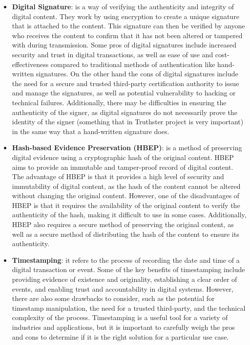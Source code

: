 \documentclass[target=mst,aauheader=]{thud}
\begin{document}
\begin{itemize}

    \item \textbf{Digital Signature}: is a way of verifying the authenticity and integrity of digital content. They work by using encryption to create a unique signature that is attached to the content. This signature can then be verified by anyone who receives the content to confirm that it has not been altered or tampered with during transmission. Some pros of digital signatures include increased security and trust in digital transactions, as well as ease of use and cost-effectiveness compared to traditional methods of authentication like hand-written signatures. On the other hand the cons of digital signatures include the need for a secure and trusted third-party certification authority to issue and manage the signatures, as well as potential vulnerability to hacking or technical failures. Additionally, there may be difficulties in ensuring the authenticity of the signer, as digital signatures do not necessarily prove the identity of the signer (something that in Truthster project is very important) in the same way that a hand-written signature does.
    \item \textbf{Hash-based Evidence Preservation (HBEP)}: is a method of preserving digital evidence using a cryptographic hash of the original content. HBEP aims to provide an immutable and tamper-proof record of digital content. The advantage of HBEP is that it provides a high level of security and immutability of digital content, as the hash of the content cannot be altered without changing the original content. However, one of the disadvantages of HBEP is that it requires the availability of the original content to verify the authenticity of the hash, making it difficult to use in some cases. Additionally, HBEP also requires a secure method of preserving the original content, as well as a secure method of distributing the hash of the content to ensure its authenticity.
    \item \textbf{Timestamping}: it refers to the process of recording the date and time of a digital transaction or event. Some of the key benefits of timestamping include providing evidence of existence and originality, establishing a clear order of events, and enabling trust and accountability in digital systems. However, there are also some drawbacks to consider, such as the potential for timestamp manipulation, the need for a trusted third-party, and the technical complexity of the process. Timestamping is a useful tool for a variety of industries and applications, but it is important to carefully weigh the pros and cons to determine if it is the right solution for a particular use case.

\end{itemize}
\end{document}
